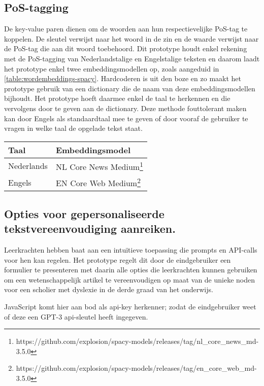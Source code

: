 \subsection{PoS-tagging}

De key-value paren dienen om de woorden aan hun respectievelijke PoS-tag te koppelen. De sleutel verwijst naar het woord in de zin en de waarde verwijst naar de PoS-tag die aan dit woord toebehoord.  Dit prototype houdt enkel rekening met de PoS-tagging van Nederlandstalige en Engelstalige teksten en daarom laadt het prototype enkel twee embeddingsmodellen op, zoals aangeduid in \ref{table:wordembeddings-spacy}. Hardcoderen is uit den boze en zo maakt het prototype gebruik van een dictionary die de naam van deze embeddingsmodellen bijhoudt. Het prototype hoeft daarmee enkel de taal te herkennen en die vervolgens door te geven aan de dictionary. Deze methode fouttolerant maken kan door Engels als standaardtaal mee te geven of door vooraf de gebruiker te vragen in welke taal de opgelade tekst staat.

\begin{center}
	\begin{tabular}{ | m{4cm} | m{12cm} | } 
		\hline
		\textbf{Taal} & \textbf{Embeddingsmodel} \\
		\hline
		Nederlands & NL Core News Medium\footnote{https://github.com/explosion/spacy-models/releases/tag/nl_core_news_md-3.5.0} \\ 
		\hline
		Engels & EN Core Web Medium\footnote{https://github.com/explosion/spacy-models/releases/tag/en_core_web_md-3.5.0} \\
		\hline
	\end{tabular}
	\label{table:wordembeddings-spacy}
\end{center}

\subsection{Opties voor gepersonaliseerde tekstvereenvoudiging aanreiken.}

Leerkrachten hebben baat aan een intuïtieve toepassing die prompts en API-calls voor hen kan regelen. Het prototype regelt dit door de eindgebruiker een formulier te presenteren met daarin alle opties die leerkrachten kunnen gebruiken om een wetenschappelijk artikel te vereenvoudigen op maat van de unieke noden voor een scholier met dyslexie in de derde graad van het onderwijs. 

JavaScript komt hier aan bod als api-key herkenner; zodat de eindgebruiker weet of deze een GPT-3 api-sleutel heeft ingegeven.



